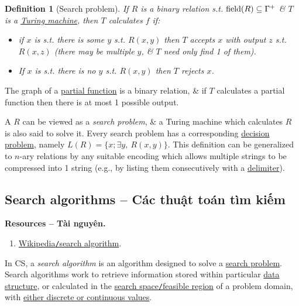 \documentclass{article}
\newtheorem{definition}{Definition}
\begin{document}
\begin{definition}[Search problem]
	If $R$ is a binary relation s.t. ${\rm field}(R)\subseteq\Gamma^+$ \& $T$ is a \href{https://en.wikipedia.org/wiki/Turing_machine}{Turing machine}, then $T$ calculates $f$ if:
	\begin{itemize}
		\item if $x$ is s.t. there is some $y$ s.t. $R(x,y)$ then $T$ accepts $x$ with output $z$ s.t. $R(x,z)$ (there may be multiple $y$, \& $T$ need only find 1 of them).
		\item If $x$ is s.t. there is no $y$ s.t. $R(x,y)$ then $T$ rejects $x$.
	\end{itemize}
\end{definition}
The graph of a \href{https://en.wikipedia.org/wiki/Partial_function}{partial function} is a binary relation, \& if $T$ calculates a partial function then there is at most 1 possible output.

A $R$ can be viewed as a {\it search problem}, \& a Turing machine which calculates $R$ is also said to solve it. Every search problem has a corresponding \href{https://en.wikipedia.org/wiki/Decision_problem}{decision problem}, namely $L(R) = \{x;\exists y,\ R(x,y)\}$. This definition can be generalized to $n$-ary relations by any suitable encoding which allows multiple strings to be compressed into 1 string (e.g., by listing them consecutively with a \href{https://en.wikipedia.org/wiki/Delimiter}{delimiter}).


\subsection{Search algorithms -- Các thuật toán tìm kiếm}
\textbf{\textsf{Resources -- Tài nguyên.}}
\begin{enumerate}
	\item \href{https://en.wikipedia.org/wiki/Search_algorithm}{Wikipedia{\tt/}search algorithm}.
\end{enumerate}
In CS, a {\it search algorithm} is an algorithm designed to solve a \href{https://en.wikipedia.org/wiki/Search_problem}{search problem}. Search algorithms work to retrieve information stored within particular \href{https://en.wikipedia.org/wiki/Data_structure}{data structure}, or calculated in the \href{https://en.wikipedia.org/wiki/Feasible_region}{search space{\tt/}feasible region} of a problem domain, with \href{https://en.wikipedia.org/wiki/Continuous_or_discrete_variable}{either discrete or continuous values}.
\end{document}
